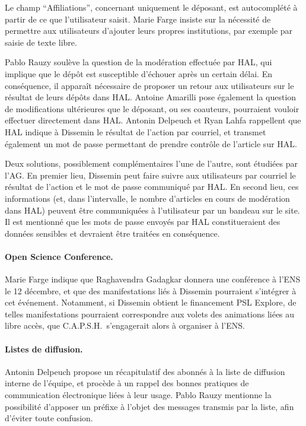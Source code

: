 \documentclass{scrartcl}
\begin{document}
Le champ ``Affiliations'', concernant uniquement le déposant, est autocomplété à
partir de ce que l'utilisateur saisit. Marie Farge insiste sur la nécessité de
permettre aux utilisateurs d'ajouter leurs propres institutions, par exemple par
saisie de texte libre.

Pablo Rauzy soulève la question de la modération effectuée par HAL, qui implique
que le dépôt est susceptible d'échouer après un certain délai. En conséquence,
il apparaît nécessaire de proposer un retour aux utilisateurs sur le résultat de
leurs dépôts dans HAL. Antoine Amarilli pose également la question de
modifications ultérieures que le déposant, ou ses coauteurs, pourraient vouloir
effectuer directement dans HAL. Antonin Delpeuch et Ryan Lahfa rappellent
que HAL indique à Dissemin le résultat de l'action par courriel, et transmet
également un mot de passe permettant de prendre contrôle de l'article sur HAL.

Deux solutions, possiblement complémentaires l'une de l'autre, sont étudiées par l'AG. En premier lieu, Dissemin
peut faire suivre aux utilisateurs par courriel le résultat de l'action et le
mot de passe communiqué par HAL. En second lieu, ces informations (et, dans
l'intervalle, le nombre d'articles en cours de modération dans HAL) peuvent être
communiquées à l'utilisateur par un bandeau sur le site. Il est mentionné que
les mots de passe envoyés par HAL constitueraient des données sensibles et
devraient être traitées en conséquence.

\paragraph{Open Science Conference.}
Marie Farge indique que Raghavendra Gadagkar donnera une conférence à l'ENS le
12 décembre, et que des manifestations liés à Dissemin pourraient s'intégrer à
cet événement. Notamment, si Dissemin obtient le financement PSL Explore, de
telles manifestations pourraient correspondre aux volets des animations liées au
libre accès, que C.A.P.S.H.\ s'engagerait alors à organiser à l'ENS.

\paragraph{Listes de diffusion.}
Antonin Delpeuch propose un récapitulatif des abonnés à la liste de diffusion
interne de l'équipe, et procède à un rappel des bonnes pratiques de
communication électronique liées à leur usage. Pablo Rauzy mentionne la
possibilité d'apposer un préfixe à l'objet des messages transmis par la liste,
afin d'éviter toute confusion.
\end{document}
